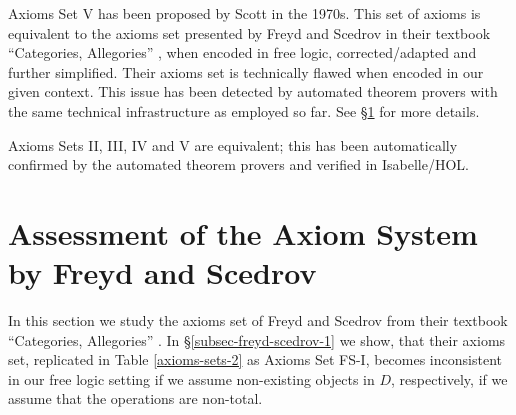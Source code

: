 
Axioms Set V has been proposed by Scott \cite{Scott79} in the 1970s. 
This set of axioms is equivalent to the axioms set presented by Freyd
and Scedrov in their textbook ``Categories, Allegories''
\cite{FreydScedrov90}, when encoded in free logic, corrected/adapted
and further simplified.  Their axioms set is technically flawed when
encoded in our given context. This issue has been detected by
automated theorem provers with the same technical infrastructure as
employed so far. See \S\ref{sec-freyd-scedrov} for more
details. 

 Axioms Sets II, III, IV and V are equivalent; this has been
 automatically 
 confirmed by the automated theorem provers and verified in
 Isabelle/HOL.

 \section{Assessment of the Axiom System by Freyd and
   Scedrov} \label{sec-freyd-scedrov} In this section we study the
 axioms set of Freyd and Scedrov from their textbook ``Categories,
 Allegories'' \cite{FreydScedrov90}.  In \S\ref{subsec-freyd-scedrov-1} we show, that their axioms set,
 replicated in Table \ref{axioms-sets-2} as Axioms Set FS-I, becomes
 inconsistent in our free logic setting if we assume non-existing
 objects in $D$, respectively, if we assume that the operations
 are non-total.


